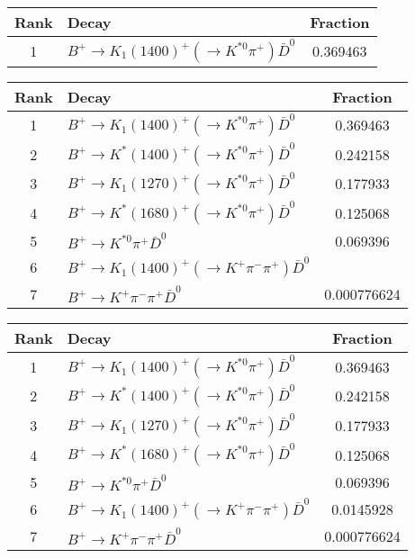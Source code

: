 \begin{table}[h]
  \centering
  \begin{tabular}{clc}
      \toprule
      Rank & Decay & Fraction \\
      \midrule
      1 & $B^+ \to K_1(1400)^+ (\to K^{*0}\pi^+) \bar{D}^0$ & 0.369463 \\ 
      \bottomrule
  \end{tabular}
\end{table}
\begin{table}[h]
  \centering
  \begin{tabular}{clc}
      \toprule
      Rank & Decay & Fraction \\
      \midrule
      1 & $B^+ \to K_1(1400)^+ (\to K^{*0}\pi^+) \bar{D}^0$ & 0.369463 \\ 
      2 & $B^+ \to K^*(1400)^+ (\to K^{*0}\pi^+) \bar{D}^0$ & 0.242158 \\ 
      3 & $B^+ \to K_1(1270)^+ (\to K^{*0}\pi^+) \bar{D}^0$ & 0.177933 \\ 
      4 & $B^+ \to K^*(1680)^+ (\to K^{*0}\pi^+) \bar{D}^0$ & 0.125068 \\ 
      5 & $B^+ \to K^{*0} \pi^+ \bar{D}^0$ & 0.069396 \\ 
      6 & $B^+ \to K_1(1400)^+ (\to K^+ \pi^- \pi^+) \bar{D}^0$ &  \\ 
      7 & $B^+ \to K^+ \pi^- \pi^+ \bar{D}^0$ & 0.000776624 \\ 
      \bottomrule
  \end{tabular}
\end{table}
\begin{table}[h]
  \centering
  \begin{tabular}{clc}
      \toprule
      Rank & Decay & Fraction \\
      \midrule
      1 & $B^+ \to K_1(1400)^+ (\to K^{*0}\pi^+) \bar{D}^0$ & 0.369463 \\ 
      2 & $B^+ \to K^*(1400)^+ (\to K^{*0}\pi^+) \bar{D}^0$ & 0.242158 \\ 
      3 & $B^+ \to K_1(1270)^+ (\to K^{*0}\pi^+) \bar{D}^0$ & 0.177933 \\ 
      4 & $B^+ \to K^*(1680)^+ (\to K^{*0}\pi^+) \bar{D}^0$ & 0.125068 \\ 
      5 & $B^+ \to K^{*0} \pi^+ \bar{D}^0$ & 0.069396 \\ 
      6 & $B^+ \to K_1(1400)^+ (\to K^+ \pi^- \pi^+) \bar{D}^0$ & 0.0145928 \\ 
      7 & $B^+ \to K^+ \pi^- \pi^+ \bar{D}^0$ & 0.000776624 \\ 
      \bottomrule
  \end{tabular}
\end{table}
